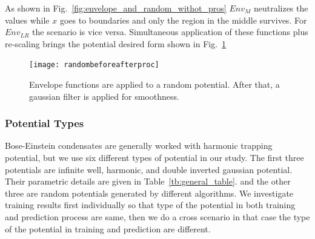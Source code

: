 \documentclass[a4paper,times,hidelinks,12pt]{article}
\begin{document}
As shown in Fig.~\ref{fig:envelope_and_random_withot_pros} $Env_{M}$ neutralizes the values while $x$ goes to boundaries and only the region in the middle survives. For $Env_{LR}$ the scenario is vice versa. Simultaneous application of these functions plus re-scaling brings the potential desired form shown in Fig.~\ref{fig:random_plus_envelope}


\graphicspath{{"../figs/potentials/"}}
\begin{figure}[H]
    \texttt{[image: randombeforeafterproc]}
\caption{Envelope functions are applied to a random potential. After that, a gaussian filter is applied for smoothness.}
\label{fig:random_plus_envelope}
\end{figure}





\subsubsection{Potential Types}

Bose-Einstein condensates are generally worked with harmonic trapping potential, but we use six different types of potential in our study. The first three potentials are infinite well, harmonic, and double inverted gaussian potential. Their parametric details are given in Table~\ref{tb:general_table}. and the other three are random potentials generated by different algorithms. We investigate training results first individually so that type of the potential in both training and prediction process are same, then we do a cross scenario in that case the type of the potential in training and prediction are different.

\newcommand{\infinitewell}{$
V(x) = 
    \begin{cases}
       0 &\quad\text{if } x_l < x < x_r  \\
       \infty &\quad\text{if } \textit{otherwise} \\
    \end{cases}
$}

\newcommand{\harmonicpot}{$ V(x) =  \frac{1}{2}m \omega^2 (x - x_0) ^2 $}
\newcommand{\gaussianpot}{$V(x) = -A_1 \exp(\frac{(x - \mu_1)^2}{\sigma_1^2}) -A_2 \exp(\frac{(x - \mu_2)^2}{\sigma_2^2})$}
\newcommand{\randomexplation}{Summation of sines and cosines with random coefficients}
\newcommand{\envelopepotLR}{$\text{Env}_{LR}(x) = [(1 + \tanh{(\beta(x + x_L))}) + (1 - \tanh{(\beta(x + x_R))})]/2$}
\newcommand{\envelopepotM}{$\text{Env}_{M}(x) = 1 - \text{Env}_{LR}(x)$}
\newcommand{\randompotONE}{$V(x_{i+1}) = V(x_i) + [X\sim\mathcal{N}(\mu, \sigma)$]}
\end{document}
